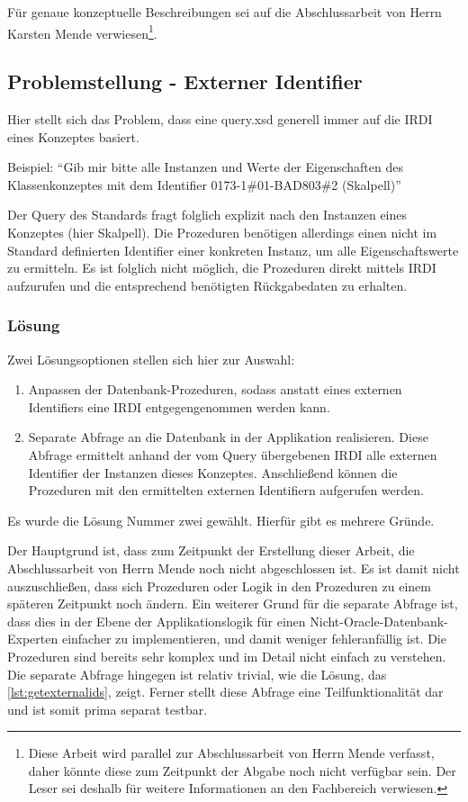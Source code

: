 Für genaue konzeptuelle Beschreibungen sei auf die Abschlussarbeit von Herrn Karsten Mende verwiesen\footnote{Diese Arbeit wird parallel zur Abschlussarbeit von Herrn Mende verfasst, daher könnte diese zum Zeitpunkt der Abgabe noch nicht verfügbar sein. Der Leser sei deshalb für weitere Informationen an den Fachbereich verwiesen.}.

\subsection{Problemstellung - Externer Identifier}\label{sec:problemidentifier}

Hier stellt sich das Problem, dass eine query.xsd generell immer auf die \gls{IRDI} eines Konzeptes basiert.

Beispiel: \enquote{Gib mir bitte alle Instanzen und Werte der Eigenschaften des Klassenkonzeptes mit dem Identifier 0173-1\#01-BAD803\#2 (Skalpell)}

Der Query des Standards fragt folglich explizit nach den Instanzen eines Konzeptes (hier Skalpell). Die Prozeduren benötigen allerdings einen nicht im Standard definierten Identifier einer konkreten Instanz, um alle Eigenschaftswerte zu ermitteln. Es ist folglich nicht möglich, die Prozeduren direkt mittels \gls{IRDI} aufzurufen und die entsprechend benötigten Rückgabedaten zu erhalten.

\subsubsection{Lösung}

Zwei Lösungsoptionen stellen sich hier zur Auswahl:
\begin{enumerate}
\item Anpassen der Datenbank-Prozeduren, sodass anstatt eines externen Identifiers eine \gls{IRDI} entgegengenommen werden kann.
\item Separate Abfrage an die Datenbank in der Applikation realisieren. Diese Abfrage ermittelt anhand der vom Query übergebenen \gls{IRDI} alle externen Identifier der Instanzen dieses Konzeptes. Anschließend können die Prozeduren mit den ermittelten externen Identifiern aufgerufen werden.   
\end{enumerate}

Es wurde die Lösung Nummer zwei gewählt. Hierfür gibt es mehrere Gründe. 

Der Hauptgrund ist, dass zum Zeitpunkt der Erstellung dieser Arbeit, die Abschlussarbeit von Herrn Mende noch nicht abgeschlossen ist. Es ist damit nicht auszuschließen, dass sich Prozeduren oder Logik in den Prozeduren zu einem späteren Zeitpunkt noch ändern.
Ein weiterer Grund für die separate Abfrage ist, dass dies in der Ebene der Applikationslogik für einen Nicht-\gls{Oracle}-Datenbank-Experten einfacher zu implementieren, und damit weniger fehleranfällig ist. Die Prozeduren sind bereits sehr komplex und im Detail nicht einfach zu verstehen. Die separate Abfrage hingegen ist relativ trivial, wie die Lösung, das \autoref{lst:getexternalids}, zeigt.
Ferner stellt diese Abfrage eine Teilfunktionalität dar und ist somit prima separat testbar.  


